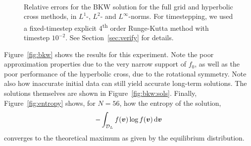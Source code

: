 \begin{figure}
    \centering
    \\
    \caption{Relative errors for the BKW solution for the full grid and hyperbolic cross methods, in $L^1$-,
    $L^2$- and $L^\infty$-norms. For timestepping, we used a fixed-timestep explicit 4\textsuperscript{th}
    order Runge-Kutta method with timestep $10^{-2}$. See Section~\vref{sec:verify} for details.}
    \label{fig:bkw} 
\end{figure}

Figure~\vref{fig:bkw} shows the results for this experiment. Note the poor approximation properties due to the
very narrow support of $f_0$, as well as the poor performance of the hyperbolic cross, due to the rotational
symmetry.  Note also how inaccurate initial data can still yield accurate long-term solutions. The solutions
themselves are shown in Figure~\vref{fig:bkw:sols}. Finally, Figure~\vref{fig:entropy} shows, for $N=56$, how
the entropy of the solution, 
\[ -\int_{\mathcal{D}_L} f({\bm v})\log f({\bm v}) \,\mathrm{d} {\bm v} \] 
converges to the theoretical maximum as given by the equilibrium distribution.

